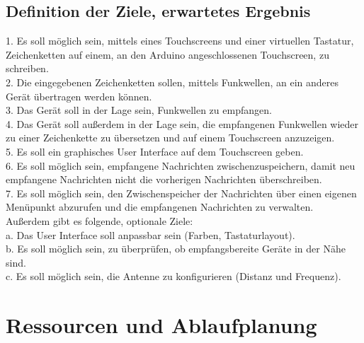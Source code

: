 \documentclass[a4paper, 11pt]{scrartcl}
\begin{document}
\subsection{Definition der Ziele, erwartetes Ergebnis}\label{ch:goals}
1. Es soll möglich sein, mittels eines Touchscreens und einer virtuellen Tastatur, Zeichenketten auf einem, an den Arduino angeschlossenen Touchscreen, zu schreiben.
\\
2. Die eingegebenen Zeichenketten sollen, mittels Funkwellen, an ein anderes Gerät übertragen werden können.
\\
3. Das Gerät soll in der Lage sein, Funkwellen zu empfangen.
\\
4. Das Gerät soll außerdem in der Lage sein, die empfangenen Funkwellen wieder zu einer Zeichenkette zu übersetzen und auf einem Touchscreen anzuzeigen.
\\
5. Es soll ein graphisches User Interface auf dem Touchscreen geben.
\\
6. Es soll möglich sein, empfangene Nachrichten zwischenzuspeichern, damit neu empfangene Nachrichten nicht die vorherigen Nachrichten überschreiben.
\\
7. Es soll möglich sein, den Zwischenspeicher der Nachrichten über einen eigenen Menüpunkt abzurufen und die empfangenen Nachrichten zu verwalten.
\\
Außerdem gibt es folgende, optionale Ziele:
\\
a. Das User Interface soll anpassbar sein (Farben, Tastaturlayout).
\\
b. Es soll möglich sein, zu überprüfen, ob empfangsbereite Geräte in der Nähe sind.
\\
c. Es soll möglich sein, die Antenne zu konfigurieren (Distanz und Frequenz).


\section{Ressourcen und Ablaufplanung}
\end{document}
